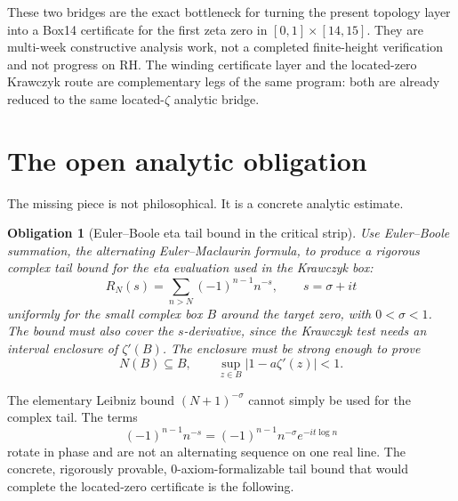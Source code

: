 \documentclass[11pt]{article}
\newtheorem{obligation}{Obligation}
\newcommand{\zetaR}{\zeta}
\begin{document}
These two bridges are the exact bottleneck for turning the present topology
layer into a Box14 certificate for the first zeta zero in
$[0,1]\times[14,15]$.  They are multi-week constructive analysis work, not a
completed finite-height verification and not progress on RH.  The winding
certificate layer and the located-zero Krawczyk route are complementary legs
of the same program: both are already reduced to the same located-$\zetaR$
analytic bridge.

\section{The open analytic obligation}

The missing piece is not philosophical.  It is a concrete analytic estimate.

\begin{obligation}[Euler--Boole eta tail bound in the critical strip]
\label{obl:eta-tail}
Use Euler--Boole summation, the alternating Euler--Maclaurin formula, to
produce a rigorous complex tail bound for the eta evaluation used in the
Krawczyk box:
$$
  R_N(s)=\sum_{n>N}(-1)^{n-1}n^{-s},
  \qquad s=\sigma+it
$$
uniformly for the small complex box $B$ around the target zero, with
$0<\sigma<1$.  The bound must also cover the $s$-derivative, since the
Krawczyk test needs an interval enclosure of $\zetaR'(B)$.  The enclosure must
be strong enough to prove
$$
  N(B)\subseteq B,
  \qquad
  \sup_{z\in B}|1-a\zetaR'(z)|<1 .
$$
\end{obligation}

The elementary Leibniz bound $(N+1)^{-\sigma}$ cannot simply be used for the
complex tail.  The terms
$$
  (-1)^{n-1}n^{-s}=(-1)^{n-1}n^{-\sigma}e^{-it\log n}
$$
rotate in phase and are not an alternating sequence on one real line.  The
concrete, rigorously provable, 0-axiom-formalizable tail bound that would
complete the located-zero certificate is the following.
\end{document}
